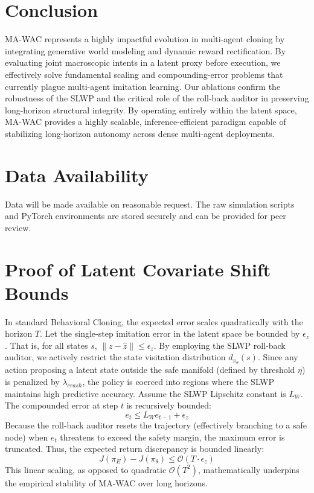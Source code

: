 \documentclass[conference]{IEEEtran}
\begin{document}
\section{Conclusion}\label{sec5}
MA-WAC represents a highly impactful evolution in multi-agent cloning by integrating generative world modeling and dynamic reward rectification. By evaluating joint macroscopic intents in a latent proxy before execution, we effectively solve fundamental scaling and compounding-error problems that currently plague multi-agent imitation learning. Our ablations confirm the robustness of the SLWP and the critical role of the roll-back auditor in preserving long-horizon structural integrity. By operating entirely within the latent space, MA-WAC provides a highly scalable, inference-efficient paradigm capable of stabilizing long-horizon autonomy across dense multi-agent deployments.

\section*{Data Availability}
Data will be made available on reasonable request. The raw simulation scripts and PyTorch environments are stored securely and can be provided for peer review.





\appendices
\section{Proof of Latent Covariate Shift Bounds}
In standard Behavioral Cloning, the expected error scales quadratically with the horizon $T$. Let the single-step imitation error in the latent space be bounded by $\epsilon_z$. That is, for all states $s$, $\lVert z - \hat{z} \rVert \leq \epsilon_z$. 
By employing the SLWP roll-back auditor, we actively restrict the state visitation distribution $d_{\pi_\theta}(s)$. Since any action proposing a latent state outside the safe manifold (defined by threshold $\eta$) is penalized by $\lambda_{crash}$, the policy is coerced into regions where the SLWP maintains high predictive accuracy.
Assume the SLWP Lipschitz constant is $L_W$. The compounded error at step $t$ is recursively bounded:
\begin{equation}
e_t \leq L_W e_{t-1} + \epsilon_z
\end{equation}
Because the roll-back auditor resets the trajectory (effectively branching to a safe node) when $e_t$ threatens to exceed the safety margin, the maximum error is truncated. Thus, the expected return discrepancy is bounded linearly:
\begin{equation}
J(\pi_E) - J(\pi_\theta) \leq \mathcal{O}(T \cdot \epsilon_z)
\end{equation}
This linear scaling, as opposed to quadratic $\mathcal{O}(T^2)$, mathematically underpins the empirical stability of MA-WAC over long horizons.
\end{document}
